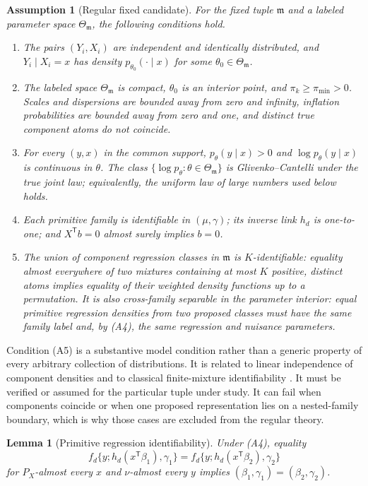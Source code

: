 \documentclass[a4paper,fleqn]{cas-sc}
\newtheorem{lemma}[theorem]{Lemma}
\newtheorem{assumption}{Assumption}
\newcommand{\T}{\mathsf T}
\newcommand{\model}{\mathfrak m}
\begin{document}
\begin{assumption}[Regular fixed candidate]
\label{ass:regular}
For the fixed tuple $\model$ and a labeled parameter space $\Theta_{\model}$, the following conditions hold.
\begin{enumerate}
\item[(A1)] The pairs $(Y_i,X_i)$ are independent and identically distributed, and $Y_i\mid X_i=x$ has density $p_{\theta_0}(\cdot\mid x)$ for some $\theta_0\in\Theta_{\model}$.
\item[(A2)] The labeled space $\Theta_{\model}$ is compact, $\theta_0$ is an interior point, and $\pi_k\geq\pi_{\min}>0$. Scales and dispersions are bounded away from zero and infinity, inflation probabilities are bounded away from zero and one, and distinct true component atoms do not coincide.
\item[(A3)] For every $(y,x)$ in the common support, $p_\theta(y\mid x)>0$ and $\log p_\theta(y\mid x)$ is continuous in $\theta$. The class $\{\log p_\theta:\theta\in\Theta_{\model}\}$ is Glivenko--Cantelli under the true joint law; equivalently, the uniform law of large numbers used below holds.
\item[(A4)] Each primitive family is identifiable in $(\mu,\gamma)$; its inverse link $h_d$ is one-to-one; and $X^\T b=0$ almost surely implies $b=0$.
\item[(A5)] The union of component regression classes in $\model$ is $K$-identifiable: equality almost everywhere of two mixtures containing at most $K$ positive, distinct atoms implies equality of their weighted density functions up to a permutation. It is also cross-family separable in the parameter interior: equal primitive regression densities from two proposed classes must have the same family label and, by (A4), the same regression and nuisance parameters.
\end{enumerate}
\end{assumption}

Condition (A5) is a substantive model condition rather than a generic property of every arbitrary collection of distributions. It is related to linear independence of component densities and to classical finite-mixture identifiability \citep{teicher1963identifiability,hennig2000identifiability}. It must be verified or assumed for the particular tuple under study. It can fail when components coincide or when one proposed representation lies on a nested-family boundary, which is why those cases are excluded from the regular theory.

\begin{lemma}[Primitive regression identifiability]
\label{lem:primitive}
Under (A4), equality
\[
 f_d\{y;h_d(x^\T\beta_1),\gamma_1\}
 =f_d\{y;h_d(x^\T\beta_2),\gamma_2\}
\]
for $P_X$-almost every $x$ and $\nu$-almost every $y$ implies $(\beta_1,\gamma_1)=(\beta_2,\gamma_2)$.
\end{lemma}
\end{document}
